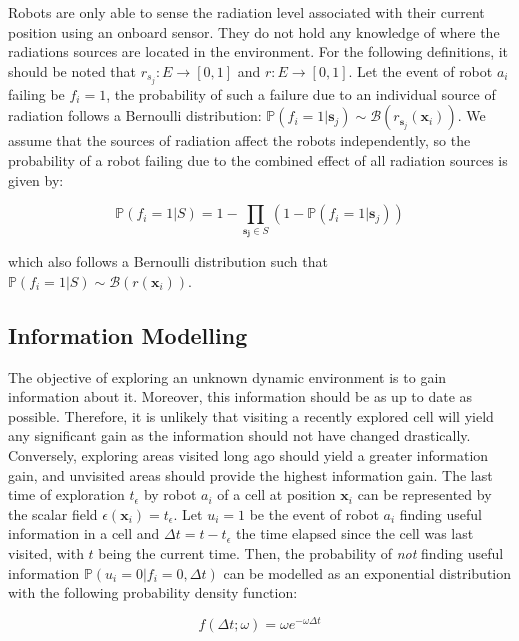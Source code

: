 \documentclass[letterpaper, 10 pt, conference]{ieeeconf}
\begin{document}
Robots are only able to sense the radiation level associated with
their current position using an onboard sensor. They do not hold any
knowledge of where the radiations sources are located in the
environment. For the following definitions, it should be noted that
$r_{s_j}: E \rightarrow [0, 1]$ and $r: E \rightarrow [0, 1]$.  Let
the event of robot $a_i$ failing be $f_i=1$, the probability of such a
failure due to an individual source of radiation follows a Bernoulli
distribution:
$\mathbb{P}(f_i = 1 | \bm{s}_j) \sim
\mathcal{B}(r_{\bm{s}_j}(\bm{x}_i))$. We assume that the sources of
radiation affect the robots independently, so the probability of a
robot failing due to the combined effect of all radiation sources is
given by:

\begin{equation}
    \mathbb{P}(f_i = 1 | S) = 1 - \prod_{\bm{s_j} \in S} (1 - \mathbb{P}(f_i = 1 | \bm{s}_j))
    \label{eq:failure}
\end{equation}

which also follows a Bernoulli distribution such that
$\mathbb{P}(f_i = 1 | S) \sim \mathcal{B}(r(\bm{x}_i))$.

\subsection{Information Modelling}
The objective of exploring an unknown dynamic environment is to gain
information about it. Moreover, this information should be as up to
date as possible. Therefore, it is unlikely that visiting a recently
explored cell will yield any significant gain as the information
should not have changed drastically. Conversely, exploring areas
visited long ago should yield a greater information gain, and
unvisited areas should provide the highest information gain. The last
time of exploration $t_\epsilon$ by robot $a_i$ of a cell at position
$\bm{x}_i$ can be represented by the scalar field
$\epsilon(\bm{x}_i) = t_\epsilon$. Let $u_i=1$ be the event of robot
$a_i$ finding useful information in a cell and
$\Delta t = t-t_\epsilon$ the time elapsed since the cell was last
visited, with $t$ being the current time. Then, the probability of
\textit{not} finding useful information
$\mathbb{P}(u_i=0 | f_i=0, \Delta t)$ can be modelled as an
exponential distribution with the following probability density
function:

\begin{equation}
    f(\Delta t;\omega) = 
       \omega e^{-\omega\Delta t}
    \label{eq:information}
\end{equation}
\end{document}
